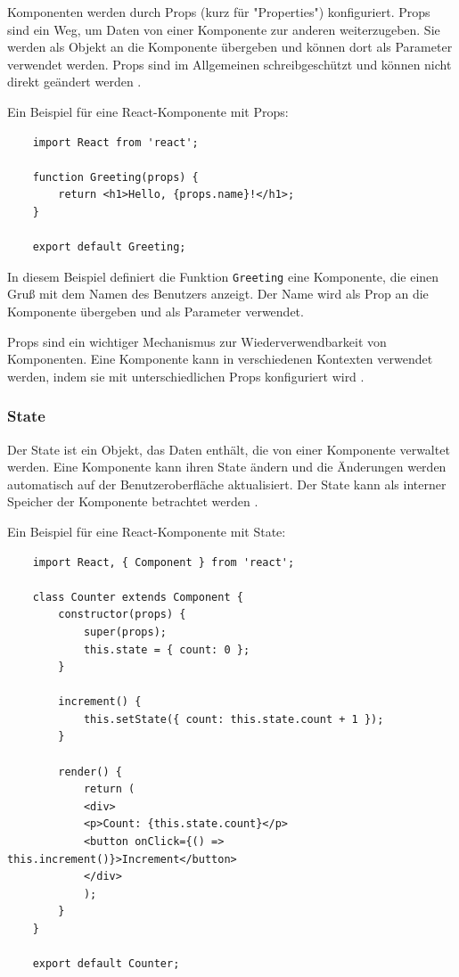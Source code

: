 Komponenten werden durch Props (kurz für "Properties") konfiguriert. Props sind ein Weg, um Daten von einer Komponente zur anderen weiterzugeben. Sie werden als Objekt an die Komponente übergeben und können dort als Parameter verwendet werden. Props sind im Allgemeinen schreibgeschützt und können nicht direkt geändert werden \cite{easeout-blog}.

Ein Beispiel für eine React-Komponente mit Props:

\begin{verbatim}
	import React from 'react';
	
	function Greeting(props) {
		return <h1>Hello, {props.name}!</h1>;
	}
	
	export default Greeting;
\end{verbatim}

In diesem Beispiel definiert die Funktion \verb|Greeting| eine Komponente, die einen Gruß mit dem Namen des Benutzers anzeigt. Der Name wird als Prop an die Komponente übergeben und als Parameter verwendet.

Props sind ein wichtiger Mechanismus zur Wiederverwendbarkeit von Komponenten. Eine Komponente kann in verschiedenen Kontexten verwendet werden, indem sie mit unterschiedlichen Props konfiguriert wird \cite{react-book}.
\subsubsection{State}
Der State ist ein Objekt, das Daten enthält, die von einer Komponente verwaltet werden. Eine Komponente kann ihren State ändern und die Änderungen werden automatisch auf der Benutzeroberfläche aktualisiert. Der State kann als interner Speicher der Komponente betrachtet werden \cite{state-docs}.

Ein Beispiel für eine React-Komponente mit State:

\begin{verbatim}
	import React, { Component } from 'react';
	
	class Counter extends Component {
		constructor(props) {
			super(props);
			this.state = { count: 0 };
		}
		
		increment() {
			this.setState({ count: this.state.count + 1 });
		}
		
		render() {
			return (
			<div>
			<p>Count: {this.state.count}</p>
			<button onClick={() => this.increment()}>Increment</button>
			</div>
			);
		}
	}
	
	export default Counter;
\end{verbatim}

